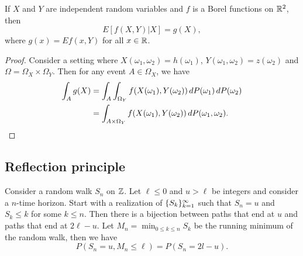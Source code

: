 \documentclass[a4paper]{article}
\begin{document}
\begin{prop}
  If $X$ and $Y$ are independent random variables
  and $f$ is a Borel functions on $\mathbb{R}^2$,
  then
  \[
    E [f(X, Y) | X] = g(X),
  \]
  where $g(x) = E f(x, Y)$ for all $x \in \mathbb{R}$.
\end{prop}

\begin{proof}
  Consider a setting where $X(\omega_1, \omega_2) = h(\omega_1)$,
  $Y(\omega_1, \omega_2) = z(\omega_2)$ and $\Omega = \Omega_X \times
    \Omega_Y$. Then for any event $A \in \Omega_X$, we have
  \begin{align*}
    \int_A g(X)
     & = \int_A \int_{\Omega_Y}
    f(X(\omega_1), Y(\omega_2))  \, d P(\omega_1) \, d P(\omega_2) \\
     & = \int_{A \times \Omega_Y} f(X(\omega_1), Y(\omega_2))
    \, d P(\omega_1, \omega_2).
  \end{align*}
\end{proof}

\subsection{Reflection principle}
Consider a random walk $S_n$ on $\mathbb{Z}$.
Let $\ell \leq 0$ and $u > \ell$ be integers and consider a $n$-time horizon.
Start with a realization of
$\{ S_k \}_{k=1}^\infty$ such that $S_n = u$ and $S_k \leq k$ for some
$k \leq n$. Then there is a bijection between paths that end at $u$
and paths that end at $2 \ell - u$. Let $M_n = \min_{0 \leq k \leq n} S_k$
be the running minimum of the random walk, then we have
\[
  P \left( S_n = u, M_n \leq \ell \right)
  = P (S_n = 2l - u).
\]
\end{document}
